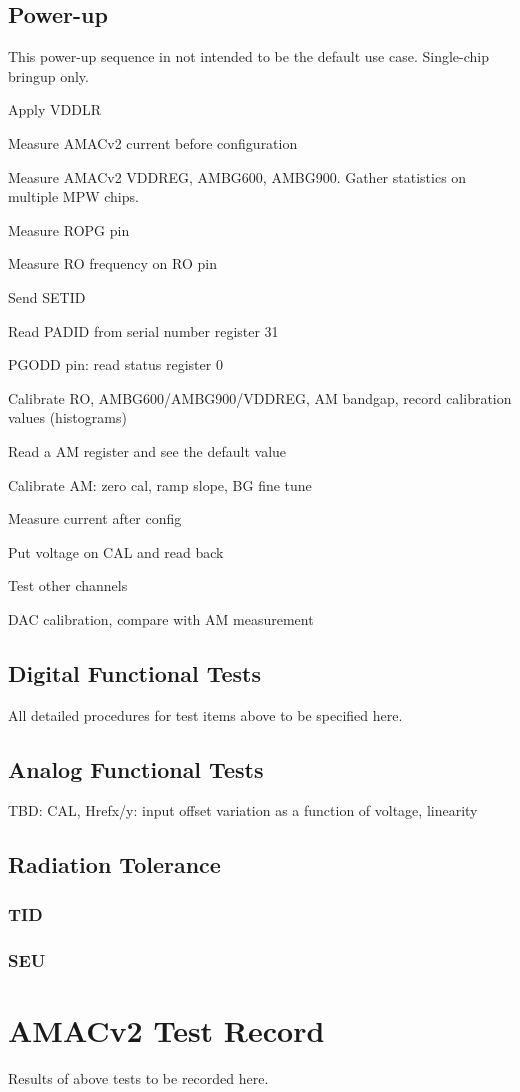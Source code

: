 \documentclass[11pt]{article}   			%
\begin{document}
\subsection{Power-up}
This power-up sequence in not intended to be the default use case. Single-chip bringup only.
\begin{compactitem}
    \item{Apply VDDLR}
    \item{Measure AMACv2 current before configuration}
	\item{Measure AMACv2 VDDREG, AMBG600, AMBG900. Gather statistics on multiple MPW chips.}
    \item{Measure ROPG pin}
    \item{Measure RO frequency on RO pin}
    \item{Send SETID}
    \item{Read PADID from serial number register 31}
    \item{PGODD pin: read status register 0}
    \item{Calibrate RO, AMBG600/AMBG900/VDDREG, AM bandgap, record calibration values (histograms)}
    \item{Read a AM register and see the default value}
    \item{Calibrate AM: zero cal, ramp slope, BG fine tune}
    \item{Measure current after config}
    \item{Put voltage on CAL and read back}
    \item{Test other channels}
    \item{DAC calibration, compare with AM measurement}
\end{compactitem}

\subsection{Digital Functional Tests}
All detailed procedures for test items above to be specified here.

\subsection{Analog Functional Tests}
TBD: CAL, Hrefx/y: input offset variation as a function of voltage, linearity

\subsection{Radiation Tolerance}

\subsubsection{TID}

\subsubsection{SEU}

\newpage

\section{AMACv2 Test Record}
Results of above tests to be recorded here.
\end{document}
